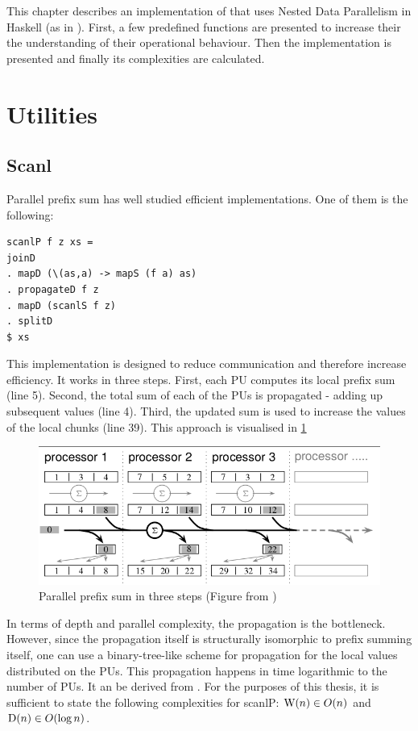 \label{chapter:ndpn}

This chapter describes an implementation of \algo that uses
Nested Data Parallelism in Haskell (as in \cite{Harness2008}).
First, a few predefined functions are presented to
increase their the understanding of their operational behaviour.
Then the implementation is presented
and finally its complexities are calculated.

\section{Utilities}

  \subsection*{Scanl}
    Parallel prefix sum has well studied efficient implementations.
    One of them is the following:
    \begin{lstlisting}   
scanlP f z xs =
joinD
. mapD (\(as,a) -> mapS (f a) as)
. propagateD f z
. mapD (scanlS f z)
. splitD
$ xs
    \end{lstlisting}
    This implementation is designed to reduce communication
    and therefore increase efficiency. It works in three steps.
    First, each PU computes its local prefix sum (line 5).
    Second, the total sum of each of the PUs is propagated
    - adding up subsequent values (line 4).
    Third, the updated sum is used to increase the values of the local chunks (line 39).
    This approach is visualised in \ref{figure:scanlPsteps}
    
    \begin{figure}[h!]
        \includegraphics[width=\linewidth]{scanlP-three-steps.png}
        \caption{Parallel prefix sum in three steps (Figure from \cite{DistTypes1999}) }
        \label{figure:scanlPsteps}
    \end{figure}
    In terms of depth and parallel complexity, the propagation is the bottleneck.
    However, since the propagation itself is structurally isomorphic to prefix summing itself,
    one can use a binary-tree-like scheme for propagation for the local values distributed on the PUs.
    This propagation happens in time logarithmic to the number of PUs.
    It an be derived from \cite{Scanl1980}. For the purposes of this thesis,
    it is sufficient to state the following complexities for scanlP:
    $\textrm{W}(n) \in O(n)$ and $\textrm{D}(n) \in O(\log n)$.

